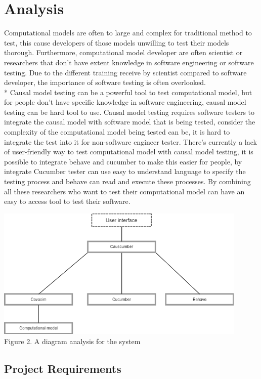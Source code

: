 \chapter{Analysis}
Computational models are often to large and complex for traditional method to test, this cause developers of those models unwilling to test their models thorough. Furthermore, computational model developer are often scientist or researchers that don’t have extent knowledge in software engineering or software testing. Due to the different training receive by scientist compared to software developer, the importance of software testing is often overlooked.  \\*
Causal model testing can be a powerful tool to test computational model, but for people don’t have specific knowledge in software engineering, causal model testing can be hard tool to use. Causal model testing requires software testers to integrate the causal model with software model that is being tested, consider the complexity of the computational model being tested can be, it is hard to integrate the test into it for non-software engineer tester. There’s currently a lack of user-friendly way to test computational model with causal model testing, it is possible to integrate behave and cucumber to make this easier for people, by integrate Cucumber tester can use easy to understand language to specify the testing process and behave can read and execute these processes. By combining all these researchers who want to test their computational model can have an easy to access tool to test their software.
\begin{center}
\includegraphics[width=12cm]{figures/Analysis.png}\\
Figure 2. A diagram analysis for the system
\end{center}
\section{Project Requirements}

